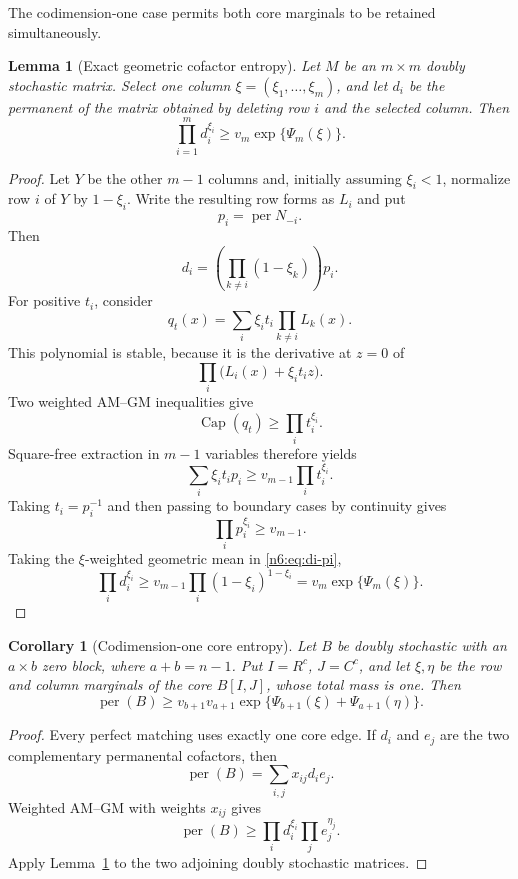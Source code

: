 \documentclass[11pt]{article}
\numberwithin{equation}{section}
\newtheorem{lemma}[theorem]{Lemma}
\newtheorem{corollary}[theorem]{Corollary}
\theoremstyle{definition}
\newcommand{\per}{\operatorname{per}}
\newcommand{\pcap}{\operatorname{Cap}}
\begin{document}
The codimension-one case permits both core marginals to be retained
simultaneously.

\begin{lemma}[Exact geometric cofactor entropy]\label{n6:lem:cofactor}
Let $M$ be an $m\times m$ doubly stochastic matrix.  Select one column
$\xi=(\xi_1,\dots,\xi_m)$, and let $d_i$ be the permanent of the matrix
obtained by deleting row $i$ and the selected column.  Then
\begin{equation}
 \prod_{i=1}^m d_i^{\xi_i}
 \ge v_m\exp\{\Psi_m(\xi)\}.\label{n6:eq:cofactor-exact}
\end{equation}
\end{lemma}

\begin{proof}
Let $Y$ be the other $m-1$ columns and, initially assuming $\xi_i<1$, normalize
row $i$ of $Y$ by $1-\xi_i$.  Write the resulting row forms as $L_i$ and put
\[
 p_i=\per N_{-i}.
\]
Then
\begin{equation}
 d_i=\left(\prod_{k\ne i}(1-\xi_k)\right)p_i.\label{n6:eq:di-pi}
\end{equation}
For positive $t_i$, consider
\[
 q_t(x)=\sum_i\xi_i t_i\prod_{k\ne i}L_k(x).
\]
This polynomial is stable, because it is the derivative at $z=0$ of
\[
 \prod_i\bigl(L_i(x)+\xi_i t_i z\bigr).
\]
Two weighted AM--GM inequalities give
\[
 \pcap(q_t)\ge\prod_i t_i^{\xi_i}.
\]
Square-free extraction in $m-1$ variables therefore yields
\[
 \sum_i\xi_i t_i p_i
 \ge v_{m-1}\prod_i t_i^{\xi_i}.
\]
Taking $t_i=p_i^{-1}$ and then passing to boundary cases by continuity gives
\[
 \prod_i p_i^{\xi_i}\ge v_{m-1}.
\]
Taking the $\xi$-weighted geometric mean in \eqref{n6:eq:di-pi},
\[
 \prod_i d_i^{\xi_i}
 \ge v_{m-1}\prod_i(1-\xi_i)^{1-\xi_i}
 =v_m\exp\{\Psi_m(\xi)\}.
\]
\end{proof}

\begin{corollary}[Codimension-one core entropy]\label{n6:cor:codim-one}
Let $B$ be doubly stochastic with an $a\times b$ zero block, where
$a+b=n-1$.  Put $I=R^c$, $J=C^c$, and let $\xi,\eta$ be the row and column
marginals of the core $B[I,J]$, whose total mass is one.  Then
\begin{equation}
 \per(B)
 \ge v_{b+1}v_{a+1}
 \exp\{\Psi_{b+1}(\xi)+\Psi_{a+1}(\eta)\}.\label{n6:eq:codim-one-exact}
\end{equation}
\end{corollary}

\begin{proof}
Every perfect matching uses exactly one core edge.  If $d_i$ and $e_j$ are the
two complementary permanental cofactors, then
\[
 \per(B)=\sum_{i,j}x_{ij}d_i e_j.
\]
Weighted AM--GM with weights $x_{ij}$ gives
\[
 \per(B)\ge\prod_i d_i^{\xi_i}\prod_j e_j^{\eta_j}.
\]
Apply Lemma~\ref{n6:lem:cofactor} to the two adjoining doubly stochastic
matrices.
\end{proof}
\end{document}
